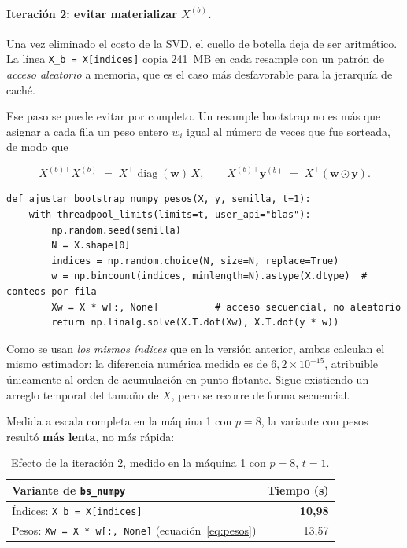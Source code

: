 \documentclass[11pt,letterpaper]{article}
\begin{document}
\paragraph{Iteración 2: evitar materializar $X^{(b)}$.}
Una vez eliminado el costo de la SVD, el cuello de botella deja de ser aritmético. La
línea \texttt{X\_b = X[indices]} copia 241~MB en cada resample con un patrón de
\emph{acceso aleatorio} a memoria, que es el caso más desfavorable para la jerarquía de
caché.

Ese paso se puede evitar por completo. Un resample bootstrap no es más que asignar a
cada fila un peso entero $w_i$ igual al número de veces que fue sorteada, de modo que

\begin{equation}
X^{(b)\top} X^{(b)} \;=\; X^\top \operatorname{diag}(\mathbf{w})\, X,
\qquad
X^{(b)\top} \mathbf{y}^{(b)} \;=\; X^\top (\mathbf{w} \odot \mathbf{y}).
\label{eq:pesos}
\end{equation}

\begin{lstlisting}[caption={Variante con pesos multinomiales (\texttt{bs\_numpy.py --pesos}).}]
def ajustar_bootstrap_numpy_pesos(X, y, semilla, t=1):
    with threadpool_limits(limits=t, user_api="blas"):
        np.random.seed(semilla)
        N = X.shape[0]
        indices = np.random.choice(N, size=N, replace=True)
        w = np.bincount(indices, minlength=N).astype(X.dtype)  # conteos por fila
        Xw = X * w[:, None]          # acceso secuencial, no aleatorio
        return np.linalg.solve(X.T.dot(Xw), X.T.dot(y * w))
\end{lstlisting}

Como se usan \emph{los mismos índices} que en la versión anterior, ambas calculan el
mismo estimador: la diferencia numérica medida es de $6{,}2 \times 10^{-15}$, atribuible
únicamente al orden de acumulación en punto flotante. Sigue existiendo un arreglo
temporal del tamaño de $X$, pero se recorre de forma secuencial.

Medida a escala completa en la máquina 1 con $p = 8$, la variante con pesos resultó
\textbf{más lenta}, no más rápida:

\begin{table}[H]
\centering
\caption{Efecto de la iteración 2, medido en la máquina 1 con $p = 8$, $t = 1$.}
\label{tab:iteracion2}
\small
\begin{tabular}{lr}
\toprule
\textbf{Variante de \texttt{bs\_numpy}} & \textbf{Tiempo (s)} \\
\midrule
Índices: \texttt{X\_b = X[indices]}                     & \textbf{10{,}98} \\
Pesos: \texttt{Xw = X * w[:, None]} (ecuación~\ref{eq:pesos}) & 13{,}57 \\
\bottomrule
\end{tabular}
\end{table}
\end{document}
